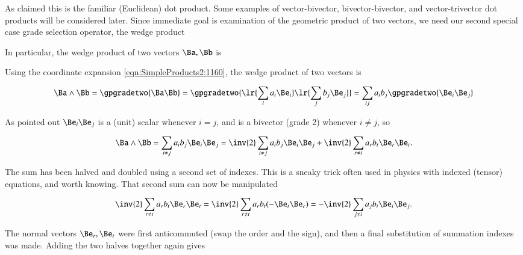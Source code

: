 As claimed this is the familiar (Euclidean) dot product.
Some examples of vector-bivector, bivector-bivector, and vector-trivector dot products will be considered later.
Since immediate goal is examination of the geometric product of two vectors, we need our second special case grade selection operator, the wedge product


In particular, the wedge product of two vectors \( \Ba, \Bb \) is


Using the coordinate expansion \cref{eqn:SimpleProducts2:1160}, the wedge product of two vectors is

\begin{dmath}\label{eqn:SimpleProducts2:1240}
\Ba \wedge \Bb
=
\gpgradetwo{ \Ba \Bb }
=
\gpgradetwo{ \lr{ \sum_i a_i \Be_i }
\lr{ \sum_j b_j \Be_j }
}
=
\sum_{ij} a_i b_j \gpgradetwo{ \Be_i \Be_j }
\end{dmath}

As pointed out \( \Be_i \Be_j \) is a (unit) scalar whenever \( i = j \), and is a bivector (grade 2) whenever \( i \ne j \), so

\begin{dmath}\label{eqn:SimpleProducts2:1260}
\Ba \wedge \Bb
=
\sum_{i \ne j} a_i b_j \Be_i \Be_j
=
\inv{2}
\sum_{i \ne j} a_i b_j
\Be_i \Be_j
+
\inv{2}
\sum_{r \ne t} a_r b_t
\Be_r \Be_t.
\end{dmath}

The sum has been halved and doubled using a second set of indexes.  This is a sneaky trick often used in physics with indexed (tensor) equations, and worth knowing.  That second sum can now be manipulated

\begin{dmath}\label{eqn:SimpleProducts2:1280}
\inv{2}
\sum_{r \ne t} a_r b_t
\Be_r \Be_t
=
\inv{2}
\sum_{r \ne t} a_r b_t
(-\Be_t \Be_r)
=
-\inv{2}
\sum_{j \ne i} a_j b_i
\Be_i \Be_j.
\end{dmath}

The normal vectors \( \Be_r, \Be_t \) were first anticommuted (swap the order and the sign), and then a final substitution of summation indexes was made.  Adding the two halves together again gives

